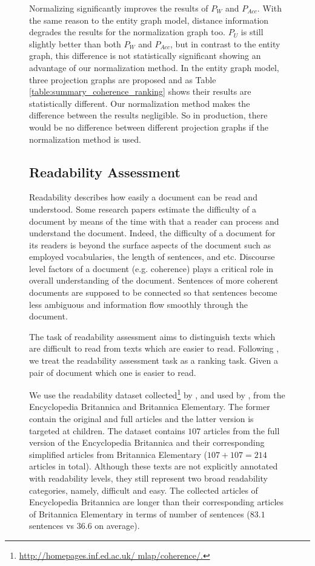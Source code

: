 \begin{figure}[!t]
Normalizing significantly improves the results of $P_W$  and $P_{Acc}$. 
With the same reason to the entity graph model, distance information degrades the results for the normalization graph too. 
$P_U$ is still slightly better than both $P_W$ and $P_{Acc}$, but in contrast to the entity graph, this difference is not statistically significant showing an advantage of our normalization method. 
In the entity graph model, three projection graphs are proposed and as Table \ref{table:summary_coherence_ranking} shows their results are statistically different. 
Our normalization method makes the difference between the results negligible. 
So in production, there would be no difference between different projection graphs if the normalization method is used. 



\subsection{Readability Assessment}
%
Readability describes how easily a document can be read and understood. 
Some research papers \cite{} estimate the difficulty of a document by means of the time with that a reader can process and understand the document. 
Indeed, the difficulty of a document for its readers is beyond the surface aspects of the document such as employed vocabularies, the length of sentences, and etc. 
Discourse level factors of a document (e.g. coherence) plays a critical role in overall understanding of the document. 
Sentences of more coherent documents are supposed to be connected so that sentences become less ambiguous and information flow smoothly through the document. 

The task of readability assessment aims to distinguish texts which are difficult to read from texts which are easier to read. 
Following \cite{guinaudeau13}, we treat the readability assessment task as a ranking task.
Given a pair of document which one is easier to read. 

We use the readability dataset collected\footnote{\url{http://homepages.inf.ed.ac.uk/ mlap/coherence/.}} by , and used by , from the Encyclopedia Britannica and Britannica Elementary. 
The former contain the original and full articles and the latter version is targeted at children. 
The dataset contains $107$ articles from the full version of the Encyclopedia Britannica and their corresponding simplified articles from Britannica Elementary ($107 + 107 = 214$ articles in total).
Although these texts are not explicitly annotated with readability levels, they still represent two broad readability categories, namely, difficult and easy. 
The collected articles of Encyclopedia Britannica are longer than their corresponding articles of Britannica Elementary in terms of number of sentences ($83.1$ sentences vs $36.6$ on average). 



\end{figure}
